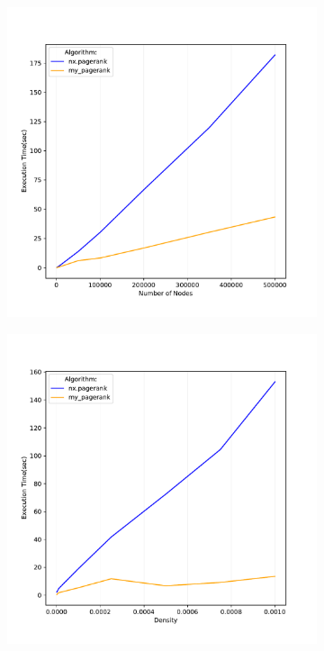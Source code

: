 \documentclass{article}
\begin{document}
\begin{figure}
     \centering
     \begin{subfigure}{0.45\textwidth}
         \centering
         \includegraphics[width=\textwidth]{time_for_nodes.pdf}
         \subcaption[]{}
         \label{fig:times_for_nodes}
     \end{subfigure}
     \hfill
     \begin{subfigure}{0.45\textwidth}
         \centering
         \includegraphics[width=\textwidth]{time_for_density.pdf}

\end{subfigure}
\end{figure}
\end{document}
